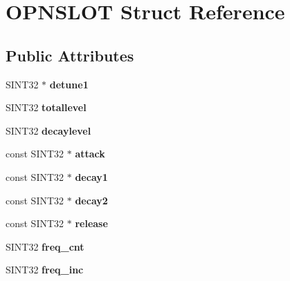 \hypertarget{structOPNSLOT}{\section{O\-P\-N\-S\-L\-O\-T Struct Reference}
\label{structOPNSLOT}
}
\subsection*{Public Attributes}
\begin{DoxyCompactItemize}
\item 
\hypertarget{structOPNSLOT_ae0e5959a2c4ba5349a83a88f6e609986}{S\-I\-N\-T32 $\ast$ {\bfseries detune1}}\label{structOPNSLOT_ae0e5959a2c4ba5349a83a88f6e609986}

\item 
\hypertarget{structOPNSLOT_aa63343bbc5a771674fc3f7993dfb5f2e}{S\-I\-N\-T32 {\bfseries totallevel}}\label{structOPNSLOT_aa63343bbc5a771674fc3f7993dfb5f2e}

\item 
\hypertarget{structOPNSLOT_a1658cbb2b0aef0a733d1989ccdcc4443}{S\-I\-N\-T32 {\bfseries decaylevel}}\label{structOPNSLOT_a1658cbb2b0aef0a733d1989ccdcc4443}

\item 
\hypertarget{structOPNSLOT_ab03710fe833681abc0e1e87350031539}{const S\-I\-N\-T32 $\ast$ {\bfseries attack}}\label{structOPNSLOT_ab03710fe833681abc0e1e87350031539}

\item 
\hypertarget{structOPNSLOT_a6b087de68f30d2fe3b836ee798e42df9}{const S\-I\-N\-T32 $\ast$ {\bfseries decay1}}\label{structOPNSLOT_a6b087de68f30d2fe3b836ee798e42df9}

\item 
\hypertarget{structOPNSLOT_a668980926f6a15af4f9683b17b9b2865}{const S\-I\-N\-T32 $\ast$ {\bfseries decay2}}\label{structOPNSLOT_a668980926f6a15af4f9683b17b9b2865}

\item 
\hypertarget{structOPNSLOT_a3a32c19e17fa53b64b220807a8a05ce6}{const S\-I\-N\-T32 $\ast$ {\bfseries release}}\label{structOPNSLOT_a3a32c19e17fa53b64b220807a8a05ce6}

\item 
\hypertarget{structOPNSLOT_a7326a27bc9ba926ed1171c2da4cf90ae}{S\-I\-N\-T32 {\bfseries freq\-\_\-cnt}}\label{structOPNSLOT_a7326a27bc9ba926ed1171c2da4cf90ae}

\item 
\hypertarget{structOPNSLOT_abcb246747e65f1a5e5406ef89bf67d6b}{S\-I\-N\-T32 {\bfseries freq\-\_\-inc}}\label{structOPNSLOT_abcb246747e65f1a5e5406ef89bf67d6b}


\end{DoxyCompactItemize}
